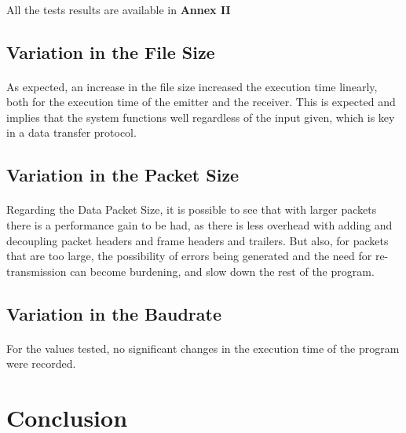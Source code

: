 \documentclass[11pt]{article}
\begin{document}
\paragraph{}All the tests results are available in \textbf{Annex II}

\subsection*{Variation in the File Size}

\paragraph{}As expected, an increase in the file size increased the execution time linearly, both for the
execution time of the emitter and the receiver. This is expected and implies that the system functions
well regardless of the input given, which is key in a data transfer protocol.

\subsection*{Variation in the Packet Size}

\paragraph{}Regarding the Data Packet Size, it is possible to see that with larger packets there is a
performance gain to be had, as there is less overhead with adding and decoupling packet headers and frame
headers and trailers. But also, for packets that are too large, the possibility of errors being generated
and the need for re-transmission can become burdening, and slow down the rest of the program.

\subsection*{Variation in the Baudrate}

\paragraph{}For the values tested, no significant changes in the execution time of the program were recorded.

\section{Conclusion}
\end{document}
